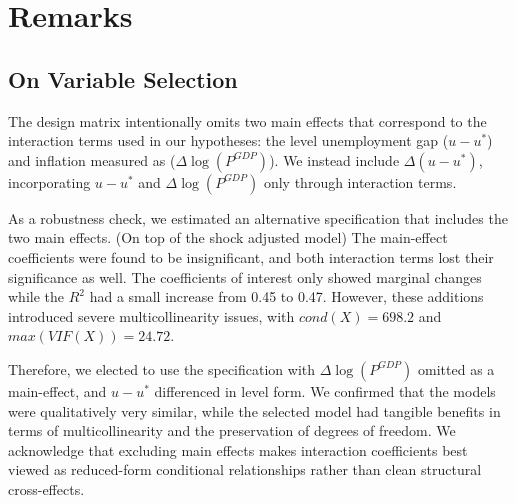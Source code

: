 \section{Remarks}\label{sec:remarks}

\subsection{On Variable Selection}\label{subsec:remark_var_selection}
The design matrix intentionally omits two main effects that correspond to the interaction terms used in our hypotheses: the level unemployment gap ($u - u^*$) and inflation measured as ($\Delta\log(P^{GDP})$).
We instead include $\Delta (u - u^*)$, incorporating $u - u^*$ and $\Delta\log(P^{GDP})$ only through interaction terms.

\vspace{\baselineskip}
As a robustness check, we estimated an alternative specification that includes the two main effects. (On top of the shock adjusted model)
The main-effect coefficients were found to be insignificant, and both interaction terms lost their significance as well.
The coefficients of interest only showed marginal changes while the $R^2$ had a small increase from 0.45 to 0.47.
However, these additions introduced severe multicollinearity issues, with $cond(X) = 698.2$ and $max(VIF(X)) = 24.72$.

\vspace{\baselineskip}
Therefore, we elected to use the specification with $\Delta\log(P^{GDP})$ omitted as a main-effect, and $u - u^*$ differenced in level form.
We confirmed that the models were qualitatively very similar, while the selected model had tangible benefits in terms of multicollinearity and the preservation of degrees of freedom.
We acknowledge that excluding main effects makes interaction coefficients best viewed as reduced-form conditional relationships rather than clean structural cross-effects.